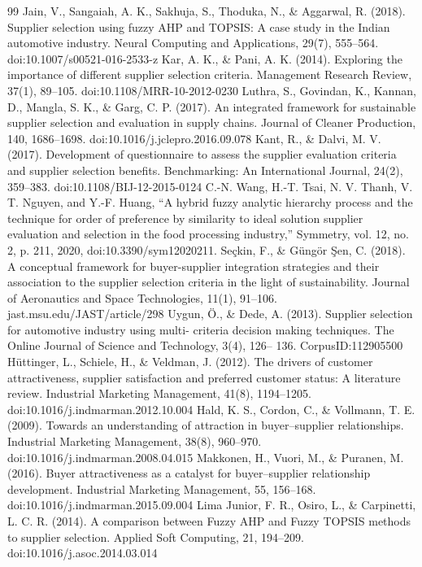 \documentclass[11pt]{article}
\begin{document}
\begin{thebibliography}{99}
 Jain, V., Sangaiah, A. K., Sakhuja, S., Thoduka, N., \& Aggarwal, R. (2018). Supplier selection using fuzzy AHP and TOPSIS: A case study in the Indian automotive industry. Neural Computing and Applications, 29(7), 555--564. doi:10.1007/s00521-016-2533-z
 Kar, A. K., \& Pani, A. K. (2014). Exploring the importance of different supplier selection criteria. Management Research Review, 37(1), 89--105. doi:10.1108/MRR-10-2012-0230
 Luthra, S., Govindan, K., Kannan, D., Mangla, S. K., \& Garg, C. P. (2017). An integrated framework for sustainable supplier selection and evaluation in supply chains. Journal of Cleaner Production, 140, 1686--1698. doi:10.1016/j.jclepro.2016.09.078
 Kant, R., \& Dalvi, M. V. (2017). Development of questionnaire to assess the supplier evaluation criteria and supplier selection benefits. Benchmarking: An International Journal, 24(2), 359--383. doi:10.1108/BIJ-12-2015-0124
 C.-N. Wang, H.-T. Tsai, N. V. Thanh, V. T. Nguyen, and Y.-F. Huang, ``A hybrid fuzzy analytic hierarchy process and the technique for order of preference by similarity to ideal solution supplier evaluation and selection in the food processing industry,'' Symmetry, vol. 12, no. 2, p. 211, 2020, doi:10.3390/sym12020211.
 Seçkin, F., \& Güngör Şen, C. (2018). A conceptual framework for buyer-supplier integration strategies and their association to the supplier selection criteria in the light of sustainability. Journal of Aeronautics and Space Technologies, 11(1), 91--106. jast.msu.edu/JAST/article/298
 Uygun, Ö., \& Dede, A. (2013). Supplier selection for automotive industry using multi- criteria decision making techniques. The Online Journal of Science and Technology, 3(4), 126-- 136. CorpusID:112905500
 Hüttinger, L., Schiele, H., \& Veldman, J. (2012). The drivers of customer attractiveness, supplier satisfaction and preferred customer status: A literature review. Industrial Marketing Management, 41(8), 1194--1205. doi:10.1016/j.indmarman.2012.10.004
 Hald, K. S., Cordon, C., \& Vollmann, T. E. (2009). Towards an understanding of attraction in buyer--supplier relationships. Industrial Marketing Management, 38(8), 960--970. doi:10.1016/j.indmarman.2008.04.015
 Makkonen, H., Vuori, M., \& Puranen, M. (2016). Buyer attractiveness as a catalyst for buyer--supplier relationship development. Industrial Marketing Management, 55, 156--168. doi:10.1016/j.indmarman.2015.09.004
 Lima Junior, F. R., Osiro, L., \& Carpinetti, L. C. R. (2014). A comparison between Fuzzy AHP and Fuzzy TOPSIS methods to supplier selection. Applied Soft Computing, 21, 194--209. doi:10.1016/j.asoc.2014.03.014

\end{thebibliography}
\end{document}
